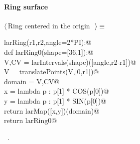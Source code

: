 \documentclass[11pt,oneside]{article}	%
\begin{document}
\paragraph{Ring surface}
\begin{flushleft} \small \label{scrap10}
$\langle\,$Ring centered in the origin\nobreak\ {\footnotesize {}}$\,\rangle\equiv$
\vspace{-1ex}
\begin{list}{}{} \item
\mbox{}\verb@def larRing(r1,r2,angle=2*PI):@\\
\mbox{}\verb@   def larRing0(shape=[36,1]):@\\
\mbox{}\verb@      V,CV = larIntervals(shape)([angle,r2-r1])@\\
\mbox{}\verb@      V = translatePoints(V,[0,r1])@\\
\mbox{}\verb@      domain = V,CV@\\
\mbox{}\verb@      x = lambda p : p[1] * COS(p[0])@\\
\mbox{}\verb@      y = lambda p : p[1] * SIN(p[0])@\\
\mbox{}\verb@      return larMap([x,y])(domain)@\\
\mbox{}\verb@   return larRing0@\\
\mbox{}\verb@@{\NWsep}
\end{list}
\vspace{-1ex}
\footnotesize\addtolength{\baselineskip}{-1ex}
\begin{list}{}{\setlength{\itemsep}{-\parsep}\setlength{\itemindent}{-\leftmargin}}
\item \NWtxtMacroRefIn\ .
\end{list}
\end{flushleft}
\end{document}
